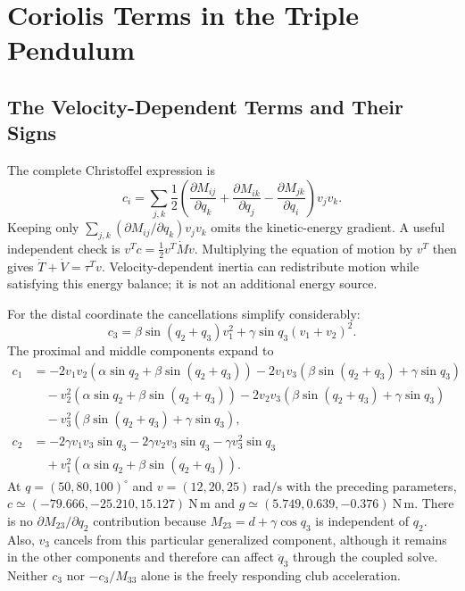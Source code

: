 \section{Coriolis Terms in the Triple Pendulum}
\label{sec:triple_pendulum_coriolis}
\subsection{The Velocity-Dependent Terms and Their Signs}
\label{inplain:triple_coriolis_complexity}
\label{laymans:inplain:triple_coriolis_complexity}
The complete Christoffel expression is
\begin{equation}
c_i=\sum_{j,k}\frac12\left(
\frac{\partial M_{ij}}{\partial q_k}
+\frac{\partial M_{ik}}{\partial q_j}
-\frac{\partial M_{jk}}{\partial q_i}\right)v_jv_k.
\label{eq:coriolis_general_form}
\end{equation}
Keeping only $\sum_{j,k}(\partial M_{ij}/\partial q_k)v_jv_k$ omits the kinetic-energy gradient. A useful independent check is $v^T c=\tfrac12v^T\dot Mv$. Multiplying the equation of motion by $v^T$ then gives $\dot T+\dot V=\tau^T v$. Velocity-dependent inertia can redistribute motion while satisfying this energy balance; it is not an additional energy source.

For the distal coordinate the cancellations simplify considerably:
\begin{equation}
c_3=\beta\sin(q_2+q_3)v_1^2
+\gamma\sin q_3(v_1+v_2)^2.
\label{eq:coriolis_club_example}
\end{equation}
The proximal and middle components expand to
\begin{equation}
\begin{aligned}
c_1&=-2v_1v_2(\alpha\sin q_2+\beta\sin(q_2+q_3))
-2v_1v_3(\beta\sin(q_2+q_3)+\gamma\sin q_3)\\
&\quad-v_2^2(\alpha\sin q_2+\beta\sin(q_2+q_3))
-2v_2v_3(\beta\sin(q_2+q_3)+\gamma\sin q_3)\\
&\quad-v_3^2(\beta\sin(q_2+q_3)+\gamma\sin q_3),\\
c_2&=-2\gamma v_1v_3\sin q_3-2\gamma v_2v_3\sin q_3-\gamma v_3^2\sin q_3\\
&\quad+v_1^2(\alpha\sin q_2+\beta\sin(q_2+q_3)).
\end{aligned}
\end{equation}
At $q=(50,80,100)^\circ$ and $v=(12,20,25)\ \mathrm{rad/s}$ with the preceding parameters, $c\simeq(-79.666,-25.210,15.127)\ \mathrm{N\,m}$ and $g\simeq(5.749,0.639,-0.376)\ \mathrm{N\,m}$.
There is no $\partial M_{23}/\partial q_2$ contribution because $M_{23}=d+\gamma\cos q_3$ is independent of $q_2$. Also, $v_3$ cancels from this particular generalized component, although it remains in the other components and therefore can affect $\ddot q_3$ through the coupled solve. Neither $c_3$ nor $-c_3/M_{33}$ alone is the freely responding club acceleration.

